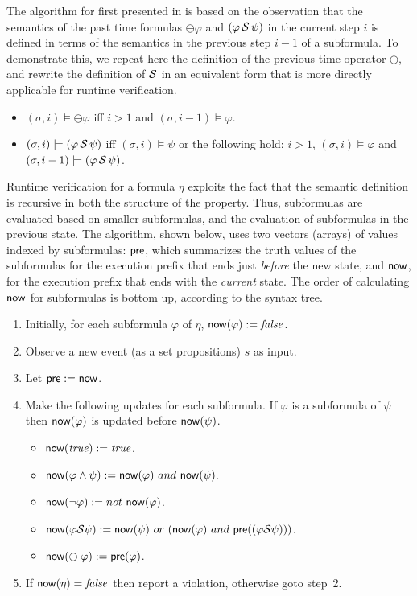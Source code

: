 The algorithm for \PLTL{} first presented in \cite{HR} 
is based on the observation that the semantics of the 
past time formulas $\ominus \varphi$ and $(\varphi\, {\cal S} \,\psi)$ in the current step $i$ is defined in terms of the semantics
in the previous step $i - 1$ of a subformula.
To demonstrate this, we repeat here the definition of the previous-time
operator $\ominus$, and rewrite the definition
of ${\cal S}$ in an equivalent form that is
more directly applicable for runtime verification.
\begin{itemize}
\item $( \sigma , i) \models \ominus \varphi$ iff $i > 1$ and $(\sigma, i-1) \models \varphi$.
\item $(\sigma , i) \models (\varphi \, {\cal S} \, \psi)$ iff $(\sigma , i) \models \psi$ or the following hold: $i>1$,
$( \sigma , i)  \models \varphi$ and 
$(\sigma , i-1 ) \models ( \varphi \, {\cal S} \, \psi )$.
\end{itemize}
Runtime verification for a \PLTL{} formula $\eta$ exploits the fact that
the semantic definition is recursive in both the structure of the property. Thus, subformulas
are evaluated based on smaller subformulas, and the
evaluation of subformulas in the previous state.
The algorithm, shown below, uses two vectors (arrays) of values indexed by subformulas:  $\mathsf{pre}$, which summarizes the truth values of the
subformulas for the execution prefix that
ends just {\em before} the new state, and $\mathsf{now}$, for the execution prefix that
ends with the {\em current} state. The order of calculating $\mathsf{now}$ for subformulas is bottom up, according to the syntax tree.
\begin{enumerate}
\item Initially, for each subformula $\varphi$
of $\eta$,
$\mathsf{now} ( \varphi ) := \mathit{false}$.

\item Observe a new event (as a set propositions) $s$ as input. 
\item Let $\mathsf{pre} := \mathsf{now}$.
\item Make the following updates for each subformula. If $\varphi$ is
      a subformula of $\psi$ then $\mathsf{now} ( \varphi )$ is updated before 
      $\mathsf{now} ( \psi )$.
\begin{itemize}
  \item $\mathsf{now} ( \mathit{true} ) := \mathit{true}$.
  \item $\mathsf{now} (  \varphi \wedge \psi  ) := 
  \mathsf{now} ( \varphi )\  and\ \mathsf{now} ( \psi )$.
  \item $\current ( \neg \varphi  ) := not\ \current ( \varphi )$.
  \item $\current (  \varphi \since \psi  ) :=  
  \current ( \psi  )\ or\ ( \current ( \varphi ) \ and\ 
      \old ( ( \varphi \since  \psi )))$.
  \item $\mathsf{now} ( \ominus \; \varphi ) := \mathsf{pre} ( \varphi )$.
\end{itemize}
\item If $\mathsf{now} (\eta) = \mathit{false}$ then
report a violation, otherwise goto step~2.
\end{enumerate}

